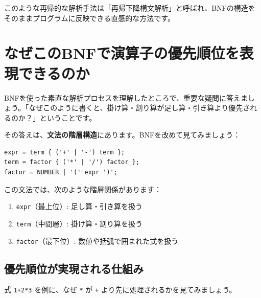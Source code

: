 このような再帰的な解析手法は「再帰下降構文解析」と呼ばれ、BNFの構造をそのままプログラムに反映できる直感的な方法です。

\hypertarget{chapter2-ux306aux305cux3053ux306ebnfux3067ux6f14ux7b97ux5b50ux306eux512aux5148ux9806ux4f4dux3092ux8868ux73feux3067ux304dux308bux306eux304b}{%
\section{なぜこのBNFで演算子の優先順位を表現できるのか}\label{chapter2-ux306aux305cux3053ux306ebnfux3067ux6f14ux7b97ux5b50ux306eux512aux5148ux9806ux4f4dux3092ux8868ux73feux3067ux304dux308bux306eux304b}}

BNFを使った素直な解析プロセスを理解したところで、重要な疑問に答えましょう。「なぜこのように書くと、掛け算・割り算が足し算・引き算より優先されるのか？」ということです。

その答えは、\textbf{文法の階層構造}にあります。BNFを改めて見てみましょう：

\begin{verbatim}
expr = term { ('+' | '-') term };
term = factor { ('*' | '/') factor };
factor = NUMBER | '(' expr ')';
\end{verbatim}

この文法では、次のような階層関係があります：

\begin{enumerate}
\def\labelenumi{\arabic{enumi}.}
\tightlist
\item
  \texttt{expr}（最上位）: 足し算・引き算を扱う
\item
  \texttt{term}（中間層）: 掛け算・割り算を扱う\\
\item
  \texttt{factor}（最下位）: 数値や括弧で囲まれた式を扱う
\end{enumerate}

\hypertarget{chapter2-ux512aux5148ux9806ux4f4dux304cux5b9fux73feux3055ux308cux308bux4ed5ux7d44ux307f}{%
\subsection{優先順位が実現される仕組み}\label{chapter2-ux512aux5148ux9806ux4f4dux304cux5b9fux73feux3055ux308cux308bux4ed5ux7d44ux307f}}

式 \texttt{1+2*3} を例に、なぜ \texttt{*} が \texttt{+}
より先に処理されるかを見てみましょう。

